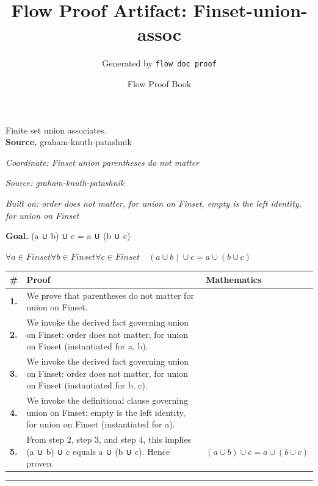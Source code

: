 \documentclass[11pt]{article}
\title{Flow Proof Artifact: Finset-union-assoc}
\author{Generated by \texttt{flow doc proof}}
\date{Flow Proof Book}
\theoremstyle{definition}
\begin{document}
\maketitle
Finite set union associates.\\[0.5em]
\textbf{Source.} graham-knuth-patashnik\\[0.5em]
\bigskip
{}\par
\smallskip\noindent\textit{Coordinate: Finset \cdot union \cdot parentheses do not matter}\par
\smallskip\noindent\textit{Source: graham-knuth-patashnik}\par
\smallskip\noindent\textit{Built on: order does not matter, for union on Finset, empty is the left identity, for union on Finset}\par
\medskip
\noindent\textbf{Goal.} (a ∪ b) ∪ c = a ∪ (b ∪ c)\par
\noindent$\displaystyle \forall a \in Finset \forall b \in Finset \forall c \in Finset\quad (a ∪ b) ∪ c = a ∪ (b ∪ c)$\par
\medskip
\noindent
\begin{tabular}{@{} >{\raggedright\arraybackslash}p{} >{\raggedright\arraybackslash}p{} >{\raggedleft\arraybackslash}p{} @{}}
\textbf{\#} & \textbf{Proof} & \textbf{Mathematics} \\
\midrule
\textbf{1.} & We prove that parentheses do not matter for union on Finset. & \\[0.45em]
\textbf{2.} & We invoke the derived fact governing union on Finset: order does not matter, for union on Finset (instantiated for a, b). & \\[0.45em]
\textbf{3.} & We invoke the derived fact governing union on Finset: order does not matter, for union on Finset (instantiated for b, c). & \\[0.45em]
\textbf{4.} & We invoke the definitional clause governing union on Finset: empty is the left identity, for union on Finset (instantiated for a). & \\[0.45em]
\textbf{5.} & From step 2, step 3, and step 4, this implies (a ∪ b) ∪ c equals a ∪ (b ∪ c). Hence proven. & $\displaystyle (a ∪ b) ∪ c = a ∪ (b ∪ c)$ \\[0.45em]
\bottomrule
\end{tabular}
\label{thm:Finset-union-parentheses_do_not_matter}
\par\medskip\hrule
\end{document}
